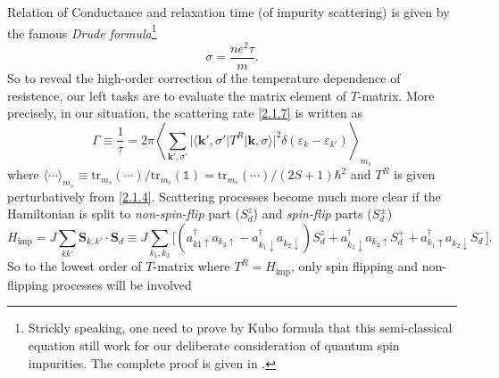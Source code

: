 \documentclass[aps,prx,superscriptaddress,onecolumn,preprintnumbers,nofootinbib,longbibliography]{revtex4-1}
\def\imp{\text{imp}}
\begin{document}
		Relation of Conductance and relaxation time (of impurity scattering) is given by the famous \emph{Drude formula}\footnote{Strickly speaking, one need to prove by Kubo formula that this semi-classical equation still work for our deliberate consideration of quantum spin impurities. The complete proof is given in \cite{hewson1997kondo}.}
		\begin{equation}\label{2.2.1}
			\sigma=\dfrac{ne^2\tau}{m}.
		\end{equation}
		So to reveal the high-order correction of the temperature dependence of resistence, our left tasks are to evaluate the matrix element of $T$-matrix. More precisely, in our situation, the scattering rate \eqref{2.1.7} is written as
		\begin{equation}\label{2.2.2}
			\Gamma\equiv\dfrac{1}{\tau}=2\pi\left\langle\sum_{\bm{k'},\sigma'}|\langle\bm{k'},\sigma'|T^R|\bm{k},\sigma\rangle|^2\delta(\varepsilon_k- \varepsilon_{k'})\right\rangle_{m_s}
		\end{equation}
		where $\langle\cdots\rangle_{m_s}\equiv\mathrm{tr}_{m_s}(\cdots)/\mathrm{tr}_{m_s}(\mathds{1})=\mathrm{tr}_{m_s}(\cdots)/(2S+1)\hbar^2$ and $T^R$ is given perturbatively from \eqref{2.1.4}. Scattering processes become much more clear if the Hamiltonian is split to \emph{non-spin-flip} part ($S_d^z$) and \emph{spin-flip} parts ($S_d^\pm$)
		\begin{equation}\label{2.2.3}
			H_\imp=J\sum_{kk'}\bm{S}_{k,k'}\cdot\bm{S}_d\equiv J\sum_{k_1,k_2}\bigg[\left(a_{k1\uparrow}^\dagger a_{k_2\uparrow}-a_{k_1\downarrow}^\dagger a_{k_2\downarrow}\right)S_d^z+a_{k_1\downarrow}^\dagger a_{k_2\uparrow}S_d^+ +a_{k_1\uparrow}^\dagger a_{k_2\downarrow}S_d^-\bigg].
		\end{equation}
		So to the lowest order of $T$-matrix where $T^R=H_\imp$, only spin flipping and non-flipping processes will be involved
\end{document}
